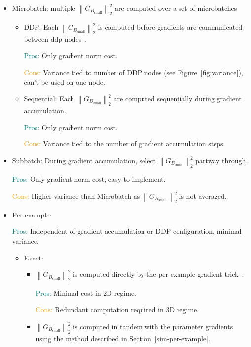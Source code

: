 \documentclass{article}
\newcommand{\Gsmall}{G_{B_{\textrm{small}}}} %
\newcommand{\sqn}[1]{\left\lVert#1\right\rVert_2^2}
\begin{document}
\begin{itemize}
    \item Microbatch: multiple $\sqn{\Gsmall}$ are computed over a set of microbatches
        \begin{itemize}
            \item DDP: Each $\sqn{\Gsmall}$ is computed before gradients are communicated between \ac{ddp} nodes~\citep{mccandlish2018empirical}.

                \textcolor{teal}{Pros:} Only gradient norm cost.

                \textcolor{orange}{Cons:} Variance tied to number of DDP nodes (see Figure~\ref{fig:variance}), can't be used on one node.
            \item Sequential: Each $\sqn{\Gsmall}$ are computed sequentially during gradient accumulation.

                \textcolor{teal}{Pros:} Only gradient norm cost.

                \textcolor{orange}{Cons:} Variance tied to the number of gradient accumulation steps.
        \end{itemize}
    \item Subbatch: During gradient accumulation, select $\sqn{\Gsmall}$ partway through.

        \textcolor{teal}{Pros:} Only gradient norm cost, easy to implement.

        \textcolor{orange}{Cons:} Higher variance than Microbatch as $\sqn{\Gsmall}$ is not averaged.
    \item Per-example:

        \textcolor{teal}{Pros:} Independent of gradient accumulation or DDP configuration, minimal variance.
        \begin{itemize}
            \item Exact:
                \begin{itemize}
                    \item $\sqn{\Gsmall}$ is computed directly by the per-example gradient trick~\citep{goodfellow2015efficient,li2022large}.

                    \textcolor{teal}{Pros:} Minimal cost in 2D regime.

                    \textcolor{orange}{Cons:} Redundant computation required in 3D regime.
                    \item $\sqn{\Gsmall}$ is computed in tandem with the parameter gradients using the method described in Section~\ref{sim-per-example}.


\end{itemize}
\end{itemize}
\end{itemize}
\end{document}
